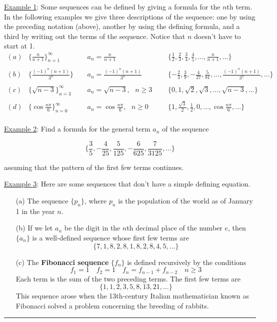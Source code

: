 \documentclass[paper=a4, fontsize=11pt]{scrartcl} %
\numberwithin{equation}{section} %
\numberwithin{figure}{section} %
\numberwithin{table}{section} %
\newcommand{\ds}{\displaystyle}
\begin{document}
  \underline{Example 1}: Some sequences can be defined by giving a formula for the $n$th term. In the following examples we give three descriptions of the sequence: one by using the preceding notation (above), another by using the defining formula, and a third by writing out the terms of the sequence. Notice that $n$ doesn't have to start at 1.
 \[ \begin{array}{rlll}
  (a) & \lbrace\ds\frac{n}{n+1}\rbrace_{n=1}^\infty \quad \quad & a_n = \ds\frac{n}{n+1} & \lbrace\ds\frac{1}{2},\ds\frac{2}{3},\ds\frac{3}{4},\ds\frac{4}{5},\ldots,\ds\frac{n}{n+1},\ldots\rbrace\\
  \text{ }\\
  (b) & \lbrace\ds\frac{(-1)^n(n+1)}{3^n}\rbrace & a_n = \ds\frac{(-1)^n(n+1)}{3^n} & \lbrace-\ds\frac{2}{3},\ds\frac{3}{9},-\ds\frac{4}{27},\ds\frac{5}{81},\ldots,\ds\frac{(-1)^n(n+1)}{3^n},\ldots\rbrace\\
  \text{ }\\
  (c) & \lbrace\ds\sqrt{n-3}\rbrace_{n=3}^\infty & a_n = \ds\sqrt{n-3}, \text{ } n\geq 3 \quad & \lbrace0,1,\sqrt{2},\sqrt{3},\ldots,\sqrt{n-3},\ldots\rbrace\\
  \text{ }\\
  (d) & \lbrace\cos\ds\frac{n\pi}{6}\rbrace_{n=0}^\infty \quad \quad & a_n = \cos\ds\frac{n\pi}{6},\text{ } n\geq 0 \quad \quad & \lbrace1,\ds\frac{\sqrt{3}}{2},\ds\frac{1}{2},0,\ldots,\cos\ds\frac{n\pi}{6},\ldots\rbrace\\
  \end{array}\]
  \indent
 \newpage

\underline{Example 2}: Find a formula for the general term $a_n$ of the sequence

\[\lbrace{\ds\frac{3}{5},-\ds\frac{4}{25},\ds\frac{5}{125},-\ds\frac{6}{625},\ds\frac{7}{3125},\ldots\rbrace}\]

assuming that the pattern of the first few terms continues.\\
\indent

\vspace{2in}

\underline{Example 3}: Here are some sequences that don't have a simple defining equation.\\
\begin{enumerate}
\item[(a)] The sequence $\{p_n\}$, where $p_n$ is the population of the world as of January 1 in the year $n$.\\
\item[(b)] If we let $a_n$ be the digit in the $n$th decimal place of the number $e$, then $\{a_n\}$ is a well-defined sequence whose first few terms are 
\[\{7,1,8,2,8,1,8,2,8,4,5,\ldots\}\]
\item[(c)] The \textbf{Fibonacci sequence} $\{f_n\}$ is defined recursively by the conditions
\[f_1=1 \quad f_2=1 \quad f_n=f_{n-1} + f_{n-2} \quad n\geq 3\]
Each term is the sum of the two preceding terms. The first few terms are
\[\{1,1,2,3,5,8,13,21,\ldots\}\]
This sequence arose when the 13th-century Italian mathematician known as Fibonacci solved a problem concerning the breeding of rabbits.\\
\end{enumerate}
\indent
\hrule
\indent
\end{document}
